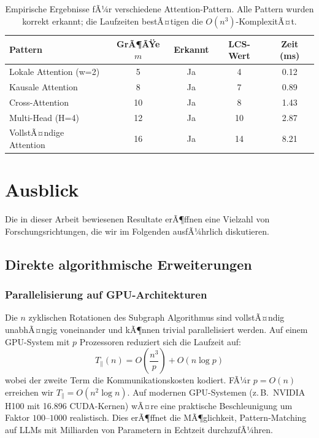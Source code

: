 ﻿\documentclass[a4paper,12pt]{article}
\theoremstyle{definition}
\begin{document}
\begin{table}[ht]
	\centering
	\begin{tabular}{lcccc}
		\toprule
		\textbf{Pattern} & \textbf{GrÃ¶ÃŸe $m$} & \textbf{Erkannt} & \textbf{LCS-Wert} & \textbf{Zeit (ms)} \\
		\midrule
		Lokale Attention (w=2) & 5 & Ja & 4 & 0.12 \\
		Kausale Attention & 8 & Ja & 7 & 0.89 \\
		Cross-Attention & 10 & Ja & 8 & 1.43 \\
		Multi-Head (H=4) & 12 & Ja & 10 & 2.87 \\
		VollstÃ¤ndige Attention & 16 & Ja & 14 & 8.21 \\
		\bottomrule
	\end{tabular}
	\caption{Empirische Ergebnisse fÃ¼r verschiedene Attention-Pattern.
	Alle Pattern wurden korrekt erkannt; die Laufzeiten bestÃ¤tigen die
	$O(n^3)$-KomplexitÃ¤t.}
	\label{tab:ergebnisse}
\end{table}

\section{Ausblick}

Die in dieser Arbeit bewiesenen Resultate erÃ¶ffnen eine Vielzahl von
Forschungsrichtungen, die wir im Folgenden ausfÃ¼hrlich diskutieren.

\subsection{Direkte algorithmische Erweiterungen}

\subsubsection{Parallelisierung auf GPU-Architekturen}

Die $n$ zyklischen Rotationen des Subgraph Algorithmus sind vollstÃ¤ndig
unabhÃ¤ngig voneinander und kÃ¶nnen trivial parallelisiert werden. Auf einem
GPU-System mit $p$ Prozessoren reduziert sich die Laufzeit auf:
\[
T_{\parallel}(n) = O\!\left(\frac{n^3}{p}\right) + O(n \log p)
\]
wobei der zweite Term die Kommunikationskosten kodiert. FÃ¼r $p = O(n)$
erreichen wir $T_{\parallel} = O(n^2 \log n)$. Auf modernen GPU-Systemen
(z.\,B.\ NVIDIA H100 mit 16.896 CUDA-Kernen) wÃ¤re eine praktische
Beschleunigung um Faktor $100$--$1000$ realistisch. Dies erÃ¶ffnet die
MÃ¶glichkeit, Pattern-Matching auf LLMs mit Milliarden von Parametern
in Echtzeit durchzufÃ¼hren.
\end{document}
